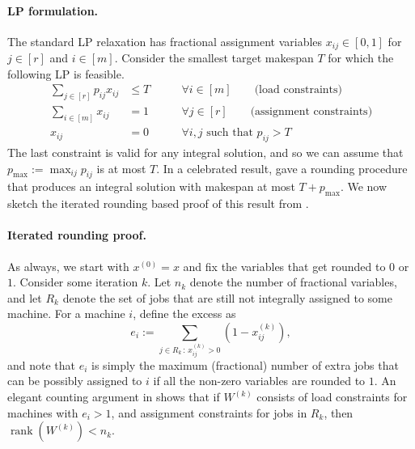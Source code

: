 \documentclass[11pt]{article}
\newcommand{\rank}{\operatorname{rank}}
\theoremstyle{definition}
\begin{document}
\paragraph{LP formulation.} The standard LP relaxation has fractional assignment variables $x_{ij} \in [0,1]$ for $j \in [r]$ and $i\in [m]$. Consider the smallest target makespan $T$ for which the following LP is feasible.
%
\begin{eqnarray*}
\sum_{j \in [r]} p_{ij} x_{ij}  & \leq  T  \qquad & \forall i \in [m]  \qquad \text{(load constraints)}\\
\sum_{i\in [m]} x_{ij}  & =  1    \qquad  & \forall j \in [r]  \qquad \text{(assignment constraints)}\\
 x_{ij} & =0 \qquad &  \forall  i,j \text{ such that }p_{ij} >T
%
\end{eqnarray*}
The last constraint is valid for any integral solution, and so we can assume that
$p_{\max}:=\max_{ij} p_{ij}$ is at most $T$.
In a celebrated result, \cite{LST} gave a rounding procedure that produces an integral solution with  makespan at most  $T + p_{\max}$.
We now  sketch the iterated rounding based proof of this result from \cite{Lau-book}.

\paragraph{Iterated rounding proof.} As always, we start with $x^{(0)}=x$ and fix the variables that get rounded to $0$ or $1$.
Consider some iteration $k$. Let $n_k$ denote the number of fractional variables, and let
 $R_k$ denote the set of jobs that are still not integrally assigned to some machine. For a machine $i$, define the excess as
\begin{equation}
\label{eq:excess} e_i:= \sum_{j \in R_k\,:\, x^{(k)}_{ij}>0} (1-x^{(k)}_{ij}),
\end{equation}
and note that
$e_i$ is simply the maximum (fractional) number of extra jobs 
that can be possibly assigned to $i$ if all the non-zero variables are rounded to $1$.
An elegant counting argument in \cite{Lau-book} shows that if $W^{(k)}$ consists of load constraints for machines with $e_i > 1$, and assignment constraints for jobs in $R_k$, then $\rank(W^{(k)}) < n_k$.
%
\end{document}
